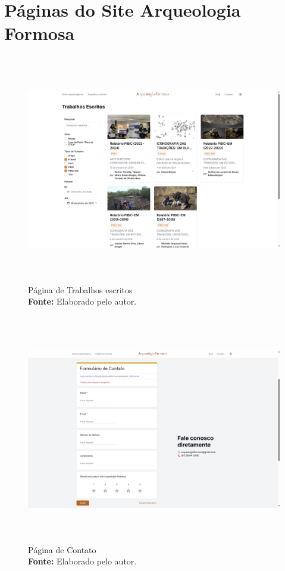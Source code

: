 \section{Páginas do Site Arqueologia Formosa}\label{ap:páginas_do_site}

\begin{figure}[H]
    \centering
    \includegraphics[height=10cm, keepaspectratio]{img/site/Trabalhos escritos.jpg}
    \caption{Página de Trabalhos escritos \\
    \textbf{Fonte:} Elaborado pelo autor.}
    \label{fig:pagina_trabalhos}
\end{figure}


\begin{figure}[H]
    \centering
    \includegraphics[height=10cm, keepaspectratio]{img/site/contato.jpg}
    \caption{Página de Contato \\
    \textbf{Fonte:} Elaborado pelo autor.}
    \label{fig:pagina_contato}
\end{figure}


